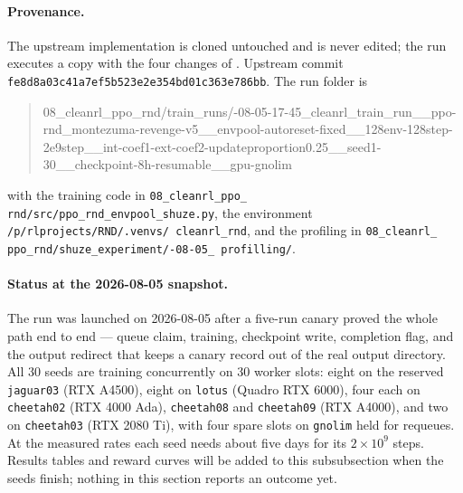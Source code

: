 \paragraph{Provenance.}
The upstream implementation is cloned untouched and is never edited; the run executes a copy with
the four changes of . Upstream commit
\texttt{fe8d8a03\allowbreak c41a7ef5\allowbreak b523e2e3\allowbreak 54bd01c3\allowbreak 63e786bb}.
The run folder is

\begin{samepage}
\begin{quote}\ttfamily\footnotesize\raggedright
08\_\allowbreak cleanrl\_\allowbreak ppo\_\allowbreak rnd/\allowbreak train\_\allowbreak runs/-08-05-17-45\_\allowbreak cleanrl\_\allowbreak train\_\allowbreak run\_\_\allowbreak ppo-rnd\_\allowbreak montezuma-revenge-v5\_\allowbreak \_\allowbreak envpool-autoreset-fixed\_\allowbreak \_\allowbreak 128env-128step-2e9step\_\allowbreak \_\allowbreak int-coef1-ext-coef2-updateproportion0.25\_\allowbreak \_\allowbreak seed1-30\_\allowbreak \_\allowbreak checkpoint-8h-resumable\_\allowbreak \_\allowbreak gpu-gnolim
\end{quote}
\end{samepage}

\noindent with the training code in \texttt{08\_\allowbreak cleanrl\_\allowbreak ppo\_\allowbreak
rnd/\allowbreak src/\allowbreak ppo\_\allowbreak rnd\_\allowbreak envpool\_\allowbreak shuze.py},
the environment \texttt{/p/\allowbreak rlprojects/\allowbreak RND/\allowbreak .venvs/\allowbreak
cleanrl\_\allowbreak rnd}, and the profiling in \texttt{08\_\allowbreak cleanrl\_\allowbreak
ppo\_\allowbreak rnd/\allowbreak shuze\_\allowbreak experiment/-08-05\_\allowbreak
profilling/}.

\paragraph{Status at the 2026-08-05 snapshot.}
The run was launched on 2026-08-05 after a five-run canary proved the whole path end to end --- queue
claim, training, checkpoint write, completion flag, and the output redirect that keeps a canary
record out of the real output directory. All $30$ seeds are training concurrently on $30$ worker
slots: eight on the reserved \texttt{jaguar03} (RTX A4500), eight on \texttt{lotus} (Quadro RTX
6000), four each on \texttt{cheetah02} (RTX 4000 Ada), \texttt{cheetah08} and \texttt{cheetah09} (RTX
A4000), and two on \texttt{cheetah03} (RTX 2080 Ti), with four spare slots on \texttt{gnolim} held
for requeues. At the measured rates each seed needs about five days for its $2\times10^{9}$ steps.
Results tables and reward curves will be added to this subsubsection when the seeds finish; nothing
in this section reports an outcome yet.

